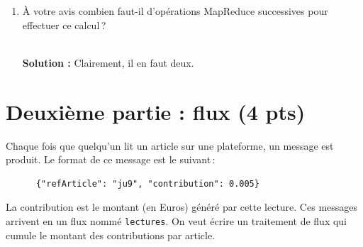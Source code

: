 \documentclass[11pt,a4paper]{article}
\newenvironment{solution}[0]{
~\\ \color{red} \textbf{Solution : }\color{black}}{%
}
\begin{document}
\begin{enumerate}
\begin{enumerate}
\begin{solution}
L'opérateur principal à mettre en œuvre est le \texttt{cogroup}. Le premier
(mais l'ordre n'est pas important) groupe les articles et les auteurs.

\begin{verbatim}
articleEtAuteur = cogroup Articles by ref, Auteurs by refArticle;
\end{verbatim} 

Puis on regroupe la collection obtenue avec la collection des diffusions.


\begin{verbatim}
articlesComplet = cogroup articleEtAuteur by ref, Diffusions by refArticle;
\end{verbatim} 
\end{solution}     

\item À votre avis combien faut-il d'opérations MapReduce successives pour effectuer ce calcul\,?

\begin{solution}
Clairement, il en faut deux.
\end{solution}
    \end{enumerate}
\end{enumerate}


\section*{Deuxième partie : flux (4 pts)}

Chaque fois que quelqu'un lit un article sur une plateforme, un 
message est produit. Le format de ce message est le suivant\,:

  \begin{small}
    \begin{verbatim}
      {"refArticle": "ju9", "contribution": 0.005}
    \end{verbatim}
    \end{small}

La contribution est le montant (en Euros) généré par cette lecture. Ces messages
arrivent en  un flux nommé \texttt{lectures}. 
On veut écrire un traitement de flux qui cumule le montant des contributions par article. 
\end{document}
